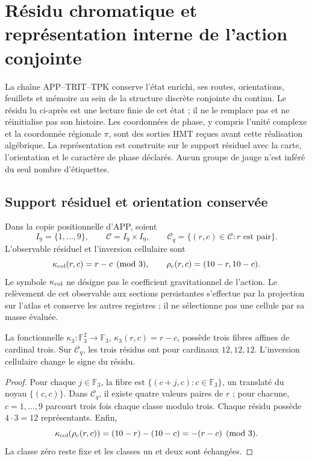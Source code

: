 \section{Résidu chromatique et représentation interne de l’action conjointe}
\label{hmtcuatro:color:seccion}

La chaîne APP--TRIT--TPK conserve l’état enrichi, ses routes, orientations, feuillets et mémoire au sein de la structure discrète conjointe du continu. Le résidu lu ci-après est une lecture finie de cet état ; il ne le remplace pas et ne réinitialise pas son histoire. Les coordonnées de phase, y compris l’unité complexe et la coordonnée régionale \(\pi\), sont des sorties HMT reçues avant cette réalisation algébrique. La représentation est construite sur le support résiduel avec la carte, l’orientation et le caractère de phase déclarés. Aucun groupe de jauge n’est inféré du seul nombre d’étiquettes.

\subsection{Support résiduel et orientation conservée}
\label{hmtcuatro:color:residuo}

Dans la copie positionnelle d’APP, soient
\[
 I_9=\{1,\ldots,9\},\qquad
 \mathcal C=I_9\times I_9,\qquad
 \mathcal C_q=\{(r,c)\in\mathcal C:r\text{ est pair}\}.
\]
L’observable résiduel et l’inversion cellulaire sont
\[
 \kappa_{\rm col}(r,c)=r-c\pmod3,\qquad
 \rho_{\rm c}(r,c)=(10-r,10-c).
\]
Le symbole \(\kappa_{\rm col}\) ne désigne pas le coefficient gravitationnel de l’action. Le relèvement de cet observable aux sections persistantes s’effectue par la projection sur l’atlas et conserve les autres registres ; il ne sélectionne pas une cellule par sa masse évaluée.

\begin{proposition}
\label{hmtcuatro:color:balance} La fonctionnelle \(\kappa_3:\mathbb F_3^2\to\mathbb F_3\), \(\kappa_3(r,c)=r-c\), possède trois fibres affines de cardinal trois. Sur \(\mathcal C_q\), les trois résidus ont pour cardinaux \(12,12,12\). L’inversion cellulaire change le signe du résidu.
\end{proposition}
\begin{proof}
Pour chaque \(j\in\mathbb F_3\), la fibre est \(\{(c+j,c):c\in\mathbb F_3\}\), un translaté du noyau \(\{(c,c)\}\). Dans \(\mathcal C_q\), il existe quatre valeurs paires de \(r\) ; pour chacune, \(c=1,\ldots,9\) parcourt trois fois chaque classe modulo trois. Chaque résidu possède \(4\cdot3=12\) représentants. Enfin,
\[
 \kappa_{\rm col}(\rho_{\rm c}(r,c))
 =(10-r)-(10-c)=-(r-c)\pmod3.
\]
La classe zéro reste fixe et les classes un et deux sont échangées.
\end{proof}

